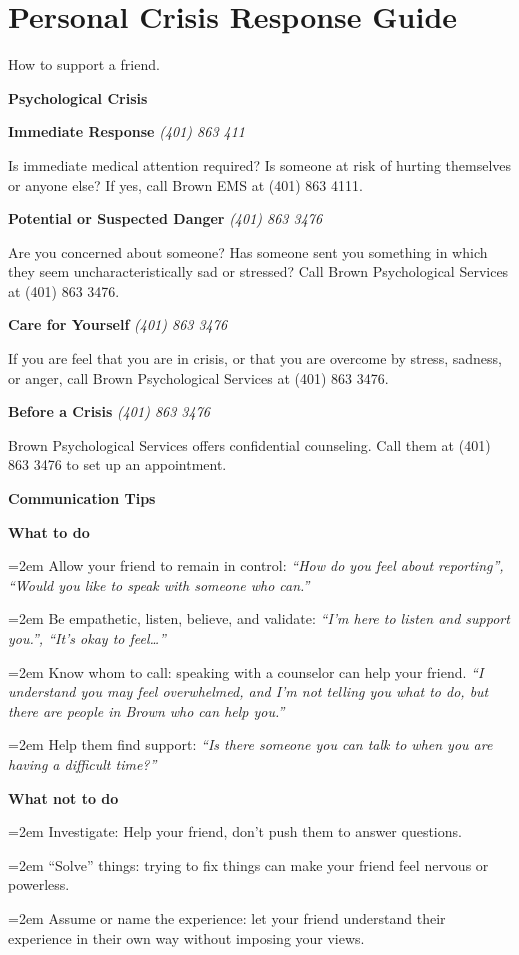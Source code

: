 \documentclass[letterpaper,10pt]{report}
\newcommand{\tosay}[1]{\textit{#1}}
\newcommand{\situation}[4]{

\parbox{\columnwidth}{
\textbf{#1} \hspace{\fill} \textit{#2} 


#3 \ifthenelse{\isempty{#4}}{}{\\ \tosay{#4}}
\vspace{6pt}}}
\newcommand{\tip}[1]{

\hangindent=2em\hangafter=1 
#1}
\newcommand{\type}[1]{\parbox{\columnwidth}{\large\textbf{#1}}}
\begin{document}
\setlength{\columnsep}{0.5in}
\section*{\centering Personal Crisis Response Guide} 
\begin{center}How to support a friend.\end{center} 
\begin{multicols}{2}
\begin{spacing}{1.15}
\type{Psychological Crisis}

\situation{Immediate Response}{(401) 863 411}{Is immediate medical attention required? Is someone at risk of hurting themselves or anyone else? If yes, call Brown EMS at (401) 863 4111.}{}

\situation{Potential or Suspected Danger}{(401) 863 3476} {Are you concerned about someone? Has someone sent you something in which they seem uncharacteristically sad or stressed? Call Brown Psychological Services at (401) 863 3476.}{}

\situation{Care for Yourself}{(401) 863 3476} { If you are feel that you are in crisis, or that you are overcome by stress, sadness, or anger, call Brown Psychological Services at (401) 863 3476.}{}

\situation{Before a Crisis}{(401) 863 3476} {Brown Psychological Services offers confidential counseling. Call them at (401) 863 3476 to set up an appointment.}{}

\type{Communication Tips}

\situation {What to do} {} {
  \tip{Allow your friend to remain in control: \tosay{``How do you feel about reporting'', ``Would you like to speak with someone who can.''}}
  \tip{Be empathetic, listen, believe, and validate: \tosay{``I'm here to listen and support you.'', ``It's okay to feel\ldots''}}
  \tip{Know whom to call: speaking with a counselor can help your friend. \tosay{``I understand you may feel overwhelmed, and I'm not telling you what to do, but there are people in Brown who can help you.''}}
  \tip{Help them find support: \tosay{``Is there someone you can talk to when you are having a difficult time?''}}
}{}


\situation {What not to do}{}{
  \tip{Investigate: Help your friend, don't push them to answer questions.}
  \tip{``Solve'' things: trying to fix things can make your friend feel nervous or powerless.}
  \tip{Assume or name the experience: let your friend understand their experience in their own way without imposing your views.}
}{}


\end{spacing}
\end{multicols}
\end{document}
